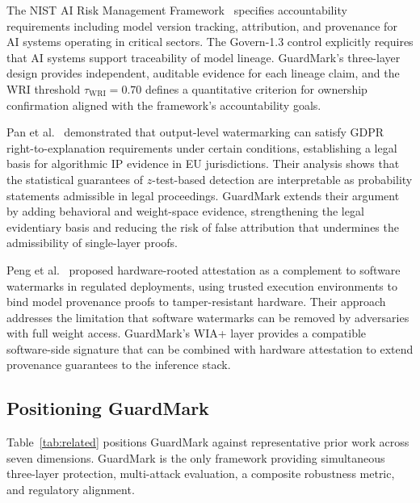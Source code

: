 \documentclass[journal,compsoc]{IEEEtran}
\newcommand{\WRI}{\mathrm{WRI}}
\begin{document}
The NIST AI Risk Management Framework~\cite{nist2023ai} specifies accountability
requirements including model version tracking, attribution, and provenance for AI
systems operating in critical sectors. The Govern-1.3 control explicitly requires
that AI systems support traceability of model lineage. GuardMark's three-layer
design provides independent, auditable evidence for each lineage claim, and the
WRI threshold $\tau_{\WRI}=0.70$ defines a quantitative criterion for ownership
confirmation aligned with the framework's accountability goals.

Pan et al.~\cite{pan2023privacy} demonstrated that output-level watermarking
can satisfy GDPR right-to-explanation requirements under certain conditions,
establishing a legal basis for algorithmic IP evidence in EU jurisdictions.
Their analysis shows that the statistical guarantees of $z$-test-based detection
are interpretable as probability statements admissible in legal proceedings.
GuardMark extends their argument by adding behavioral and weight-space evidence,
strengthening the legal evidentiary basis and reducing the risk of false
attribution that undermines the admissibility of single-layer proofs.

Peng et al.~\cite{peng2024securing} proposed hardware-rooted attestation as a
complement to software watermarks in regulated deployments, using trusted
execution environments to bind model provenance proofs to tamper-resistant
hardware. Their approach addresses the limitation that software watermarks can
be removed by adversaries with full weight access. GuardMark's WIA+ layer
provides a compatible software-side signature that can be combined with
hardware attestation to extend provenance guarantees to the inference stack.

\subsection{Positioning GuardMark}

Table~\ref{tab:related} positions GuardMark against representative prior
work across seven dimensions. GuardMark is the only framework providing
simultaneous three-layer protection, multi-attack evaluation, a composite
robustness metric, and regulatory alignment.
\end{document}
